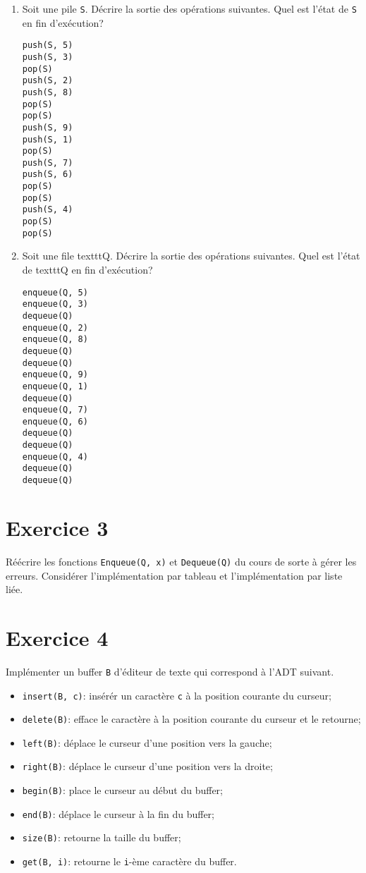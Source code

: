 \documentclass[a4paper,10pt]{article}
\begin{document}
\begin{enumerate}
\item Soit une pile \texttt{S}. Décrire la sortie des opérations suivantes. Quel est l'état de \texttt{S} en fin d'exécution?

\begin{verbatim}
push(S, 5)
push(S, 3)
pop(S)
push(S, 2)
push(S, 8)
pop(S)
pop(S)
push(S, 9)
push(S, 1)
pop(S)
push(S, 7)
push(S, 6)
pop(S)
pop(S)
push(S, 4)
pop(S)
pop(S)
\end{verbatim}

\item Soit une file texttt{Q}. Décrire la sortie des opérations suivantes. Quel
est l'état de texttt{Q} en fin d'exécution?

\begin{verbatim}
enqueue(Q, 5)
enqueue(Q, 3)
dequeue(Q)
enqueue(Q, 2)
enqueue(Q, 8)
dequeue(Q)
dequeue(Q)
enqueue(Q, 9)
enqueue(Q, 1)
dequeue(Q)
enqueue(Q, 7)
enqueue(Q, 6)
dequeue(Q)
dequeue(Q)
enqueue(Q, 4)
dequeue(Q)
dequeue(Q)
\end{verbatim}

\end{enumerate}

\section*{Exercice 3}

Réécrire les fonctions \texttt{Enqueue(Q, x)} et \texttt{Dequeue(Q)} du cours de
sorte à gérer les erreurs. Considérer l'implémentation par tableau et
l'implémentation par liste liée.

\section*{Exercice 4}

Implémenter un buffer \texttt{B} d'éditeur de texte qui correspond à l'ADT suivant.

\begin{itemize}
\item \texttt{insert(B, c)}: insérér un caractère \texttt{c} à la position courante du curseur;
\item \texttt{delete(B)}: efface le caractère à la position courante du curseur et le retourne;
\item \texttt{left(B)}: déplace le curseur d'une position vers la gauche;
\item \texttt{right(B)}: déplace le curseur d'une position vers la droite;
\item \texttt{begin(B)}: place le curseur au début du buffer;
\item \texttt{end(B)}: déplace le curseur à la fin du buffer;
\item \texttt{size(B)}: retourne la taille du buffer;
\item \texttt{get(B, i)}: retourne le \texttt{i}-ème caractère du buffer.
\end{itemize}
\end{document}
